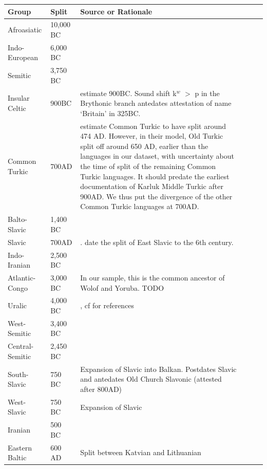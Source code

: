 \documentclass[11pt,a4paper]{article}
\begin{document}
\begin{longtable}{llp{10cm}lll}
Group & Split & Source or Rationale \\ \hline
Afroasiatic & 10,000 BC & \cite{diakonoff1998the} \\
Indo-European & 6,000 BC & \citep{gray2003language} \\
Semitic & 3,750 BC & \citep{kitchen2009bayesian} \\
Insular Celtic & 900BC & \citep{gray2003language} estimate 900BC. Sound shift k$^w$ $>$ p in the Brythonic branch antedates attestation of name `Britain' in 325BC. \\ %
Common Turkic & 700AD & \cite[p. 49]{savelyev2020bayesian} estimate Common Turkic to have split around 474 AD. However, in their model, Old Turkic split off around 650 AD, earlier than the languages in our dataset, with uncertainty about the time of split of the remaining Common Turkic languages. It should predate the earliest documentation of Karluk Middle Turkic after 900AD. We thus put the divergence of the other Common Turkic languages at 700AD. \\
Balto-Slavic & 1,400 BC & \citep{gray2003language} \\
Slavic       & 700AD & \citep{gray2003language}. \citet[p. 209]{novotna2011glottochronology} date the split of East Slavic to the 6th century. \\
Indo-Iranian & 2,500 BC & \citep[p. 138]{parpola2013formation} \\ %
Atlantic-Congo & 3,000 BC & In our sample, this is the common ancestor of Wolof and Yoruba. TODO \\
Uralic & 4,000 BC & \citep{maurits2020best}, cf \citep[p. 144]{parpola2013formation} for references \\
West-Semitic & 3,400 BC & \citep{kitchen2009bayesian}  \\
Central-Semitic & 2,450 BC & \citep{kitchen2009bayesian}   \\
South-Slavic & 750 BC & Expansion of Slavic into Balkan. Postdates Slavic and antedates Old Church Slavonic (attested after 800AD) \\
West-Slavic & 750 BC & Expansion of Slavic \\
Iranian & 500 BC & \citep{gray2003language} \\ %
Eastern Baltic & 600 AD & Split between Katvian and Lithuanian \citep[p. 209]{novotna2011glottochronology}\\

\end{longtable}
\end{document}
